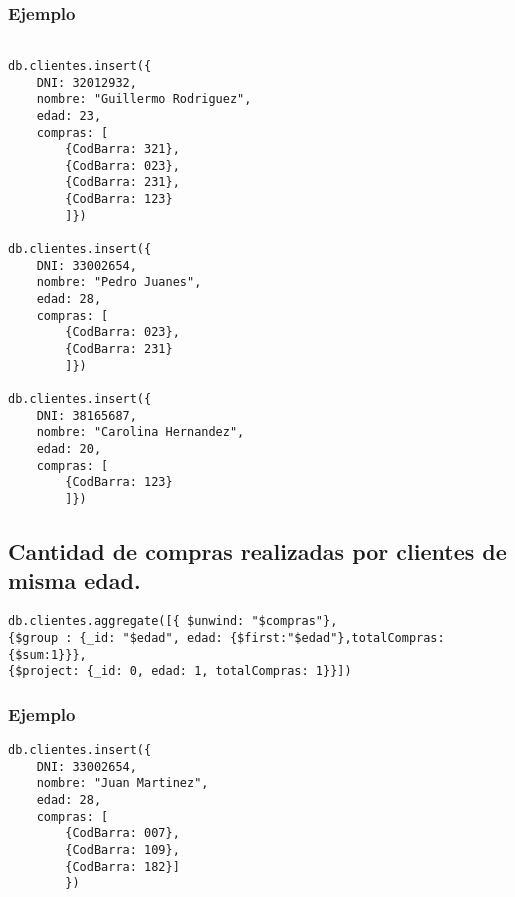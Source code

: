 \subsubsection{Ejemplo}
\begin{lstlisting}

db.clientes.insert({
	DNI: 32012932, 
	nombre: "Guillermo Rodriguez", 
	edad: 23, 
	compras: [
		{CodBarra: 321},
		{CodBarra: 023},
		{CodBarra: 231},
		{CodBarra: 123}
		]})

db.clientes.insert({
	DNI: 33002654, 
	nombre: "Pedro Juanes", 
	edad: 28, 
	compras: [
		{CodBarra: 023},
		{CodBarra: 231}
		]})

db.clientes.insert({
	DNI: 38165687, 
	nombre: "Carolina Hernandez", 
	edad: 20, 
	compras: [
		{CodBarra: 123}
		]})
\end{lstlisting}


\subsection{Cantidad de compras realizadas por clientes de misma edad.}
\begin{lstlisting}
db.clientes.aggregate([{ $unwind: "$compras"}, 
{$group : {_id: "$edad", edad: {$first:"$edad"},totalCompras:{$sum:1}}}, 
{$project: {_id: 0, edad: 1, totalCompras: 1}}])
\end{lstlisting}
\subsubsection{Ejemplo}
\begin{lstlisting}
db.clientes.insert({
	DNI: 33002654, 
	nombre: "Juan Martinez", 
	edad: 28, 
	compras: [
		{CodBarra: 007},
		{CodBarra: 109},
		{CodBarra: 182}]
		})
\end{lstlisting}
